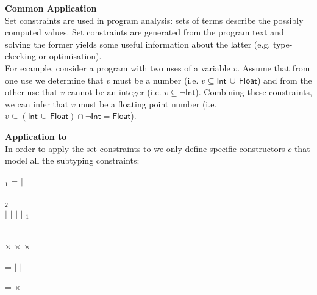 \documentclass[12pt]{article}
\begin{document}
\begin{slide}
\textbf{Common Application}\\

Set constraints are used in program analysis: sets of terms describe
the possibly computed values. Set constraints are generated from the
program text and solving the former yields some useful information
about the latter (e.g. type-ckecking or optimisation).\\

For example, consider a program with two uses of a variable
$v$. Assume that from one use we determine that $v$ must be a number
(i.e. $v \subseteq \textsf{Int} \, \cup \, \textsf{Float}$) and from
the other use that $v$ cannot be an integer (i.e. $v \subseteq
\neg\textsf{Int}$). Combining these constraints, we can infer that $v$
must be a floating point number (i.e. $v \subseteq (\textsf{Int} \,
\cup \, \textsf{Float}) \cap \neg\textsf{Int} = \textsf{Float}$).

\pagebreak

\textbf{Application to \ASN}\\

In order to apply the set constraints to \ASN we only define specific
constructors $c$ that model all the subtyping constraints:

\bigskip

 $_{1}$ = 
  \ocamlconstr{[}\Null{} $\mid$ \kwdTRUE{} $\mid$
  \kwdFALSE\ocamlconstr{]}

\noindent
{} $_{2}$ = \\
\hspace*{3mm}
\ocamlconstr{[}\Enum{}  
$\mid$ \Regexp{}  
$\mid$ 
$\mid$ 
$\mid$ $_{1}$\ocamlconstr{]}

\noindent
{}  =\\
\hspace*{3mm} 
\ocamlconstr{[}\wildcard \wildcard {} \wildcard
\wildcardof {} $\times$  
$\times$  $\times$ \ocamlconstr{]}

\noindent
{}  =
\ocamlconstr{[} 
$\mid$ \MinInfReal{} 
$\mid$ \PlusInfReal \ocamlconstr{]}

\noindent
{}  = 
\ocamlconstr{[}\Interval{}  
$\times$ \ocamlconstr{]}


\end{slide}
\end{document}
